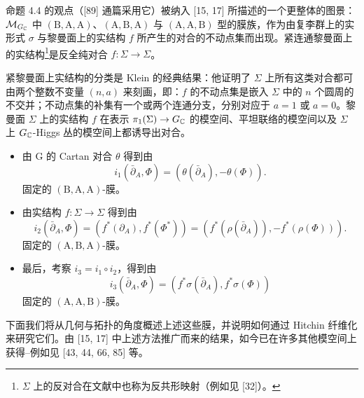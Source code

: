 
命题 4.4 的观点（[89] 通篇采用它）被纳入 [15, 17] 所描述的一个更整体的图景：$\mathcal{M}_{G_{\mathbb{C}}}$ 中 $(\mathrm{B},\mathrm{A},\mathrm{A})$、$(\mathrm{A},\mathrm{B},\mathrm{A})$ 与 $(\mathrm{A},\mathrm{A},\mathrm{B})$ 型的膜族，作为由复李群上的实形式 $\sigma$ 与黎曼面上的实结构 $f$ 所产生的对合的不动点集而出现。紧连通黎曼面上的实结构\footnote{$\Sigma$ 上的反对合在文献中也称为反共形映射（例如见 [32]）。}是反全纯对合 $f\colon\Sigma\to\Sigma$。

紧黎曼面上实结构的分类是 Klein 的经典结果：他证明了 $\Sigma$ 上所有这类对合都可由两个整数不变量 $(n,a)$ 来刻画，即：$f$ 的不动点集是嵌入 $\Sigma$ 中的 $n$ 个圆周的不交并；不动点集的补集有一个或两个连通分支，分别对应于 $a=1$ 或 $a=0$。黎曼面 $\Sigma$ 上的实结构 $f$ 在表示 $\pi_1(\Sigma)\to G_{\mathbb{C}}$ 的模空间、平坦联络的模空间以及 $\Sigma$ 上 $G_{\mathbb{C}}$-Higgs 丛的模空间上都诱导出对合。

\begin{itemize}[leftmargin=1.4em,itemsep=1pt,topsep=1pt]
\item 由 G 的 Cartan 对合 $\theta$ 得到由
\begin{equation}
i_1(\bar\partial_A,\Phi)=(\theta(\bar\partial_A),-\theta(\Phi)). \tag{4.5}
\end{equation}
固定的 $(\mathrm{B},\mathrm{A},\mathrm{A})$-膜。
\item 由实结构 $f\colon\Sigma\to\Sigma$ 得到由
\begin{equation}
i_2(\bar\partial_A,\Phi)=(f^*(\partial_A),f^*(\Phi^*))=(f^*(\rho(\bar\partial_A)),-f^*(\rho(\Phi))). \tag{4.6}
\end{equation}
固定的 $(\mathrm{A},\mathrm{B},\mathrm{A})$-膜。
\item 最后，考察 $i_3=i_1\circ i_2$，得到由
\[
i_3(\bar\partial_A,\Phi)=(f^*\sigma(\bar\partial_A),f^*\sigma(\Phi))
\]
固定的 $(\mathrm{A},\mathrm{A},\mathrm{B})$-膜。
\end{itemize}


下面我们将从几何与拓扑的角度概述上述这些膜，并说明如何通过 Hitchin 纤维化来研究它们。由 [15, 17] 中上述方法推广而来的结果，如今已在许多其他模空间上获得--例如见 [43, 44, 66, 85] 等。

